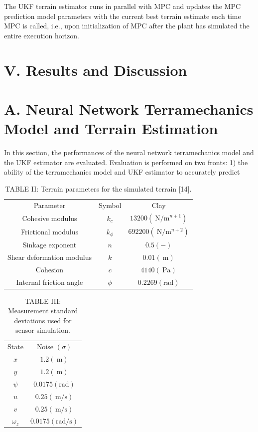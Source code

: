 \documentclass[10pt]{article}
\begin{document}
The UKF terrain estimator runs in parallel with MPC and updates the MPC prediction model parameters with the current best terrain estimate each time MPC is called, i.e., upon initialization of MPC after the plant has simulated the entire execution horizon.

\section*{V. Results and Discussion}
\section*{A. Neural Network Terramechanics Model and Terrain Estimation}
In this section, the performances of the neural network terramechanics model and the UKF estimator are evaluated. Evaluation is performed on two fronts: 1) the ability of the terramechanics model and UKF estimator to accurately predict

\begin{table}[h]
\begin{center}
\captionsetup{labelformat=empty}
\caption{TABLE II: Terrain parameters for the simulated terrain [14].}
\begin{tabular}{ccc}
\hline
Parameter & Symbol & Clay \\
Cohesive modulus & $k_{c}$ & $13200\left(\mathrm{~N} / \mathrm{m}^{n+1}\right)$ \\
Frictional modulus & $k_{\phi}$ & $692200\left(\mathrm{~N} / \mathrm{m}^{n+2}\right)$ \\
Sinkage exponent & $n$ & $0.5(-)$ \\
Shear deformation modulus & $k$ & $0.01(\mathrm{~m})$ \\
Cohesion & $c$ & $4140(\mathrm{~Pa})$ \\
Internal friction angle & $\phi$ & $0.2269(\mathrm{rad})$ \\
\hline
\end{tabular}
\end{center}
\end{table}

\begin{table}[h]
\begin{center}
\captionsetup{labelformat=empty}
\caption{TABLE III: Measurement standard deviations used for sensor simulation.}
\begin{tabular}{cc}
\hline
State & Noise $(\sigma)$ \\
$x$ & $1.2(\mathrm{~m})$ \\
$y$ & $1.2(\mathrm{~m})$ \\
$\psi$ & $0.0175(\mathrm{rad})$ \\
$u$ & $0.25(\mathrm{~m} / \mathrm{s})$ \\
$v$ & $0.25(\mathrm{~m} / \mathrm{s})$ \\
$\omega_{z}$ & $0.0175(\mathrm{rad} / \mathrm{s})$ \\
\hline
\end{tabular}
\end{center}
\end{table}
\end{document}
